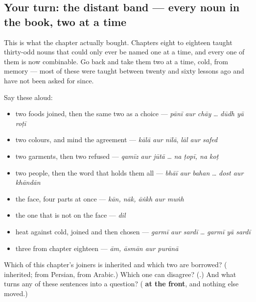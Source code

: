 \subsection*{Your turn: the distant band — every noun in the book, two at a time}
This is what the chapter actually bought. Chapters eight to eighteen taught thirty-odd nouns that could only ever be named one at a time, and every one of them is now combinable. Go back and take them two at a time, cold, from memory — most of these were taught between twenty and sixty lessons ago and have not been asked for since.

Say these aloud:

\begin{itemize}
\raggedright
  \item two foods joined, then the same two as a choice — \emph{pānī aur chāy} … \emph{dūdh yā roṭī}
  \item two colours, and mind the agreement — \emph{kālā aur nīlā}, \emph{lāl aur safed}
  \item two garments, then two refused — \emph{qamīz aur jūtā} … \emph{na ṭopī, na koṭ}
  \item two people, then the word that holds them all — \emph{bhāī aur bahan} … \emph{dost aur khāndān}
  \item the face, four parts at once — \emph{kān, nāk, āṅkh aur muṅh}
  \item the one that is not on the face — \emph{dil}
  \item heat against cold, joined and then chosen — \emph{garmī aur sardī} … \emph{garmī yā sardī}
  \item three from chapter eighteen — \emph{ām, āsmān aur purānā}
\end{itemize}

\begin{tcolorbox}[breakable,colback=teal!4,colframe=teal!35!black,title={Before you move on}]
Which of this chapter's joiners is inherited and which two are borrowed? (\textbf{} inherited; \textbf{} from Persian, \textbf{} from Arabic.) Which one can disagree? (\textbf{}.) And what turns any of these sentences into a question? (\textbf{ at the front}, and nothing else moved.)
\end{tcolorbox}
